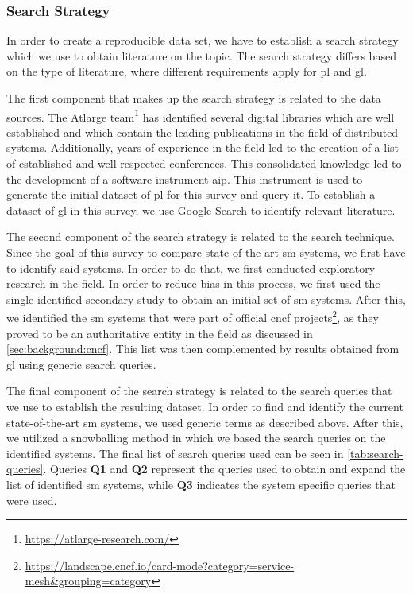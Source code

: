 \subsubsection{Search Strategy}
\label{sec:survey:methodology:review-protocol:search-strategy}

In order to create a reproducible data set, we have to establish a search strategy which we use to obtain literature on the topic. The search strategy differs based on the type of literature, where different requirements apply for \gls{pl} and \gls{gl}.


The first component that makes up the search strategy is related to the data sources. The Atlarge  team\footnote{\url{https://atlarge-research.com/}} has identified several digital libraries which are well established and which contain the leading publications in the field of distributed systems. Additionally, years of experience in the field led to the creation of a list of established and well-respected conferences. This consolidated knowledge led to the development of a software instrument \gls{aip}. This instrument is used to generate the initial dataset of \gls{pl} for this survey and query it. To establish a dataset of \gls{gl} in this survey, we use Google Search to identify relevant literature.

The second component of the search strategy is related to the search technique. Since the goal of this survey to compare state-of-the-art \gls{sm} systems, we first have to identify said systems. In order to do that, we first conducted exploratory research in the field. In order to reduce bias in this process, we first used the single identified secondary study \cite{service-mesh-survey} to obtain an initial set of \gls{sm} systems. After this, we identified the \gls{sm} systems that were part of official \gls{cncf} projects\footnote{\url{https://landscape.cncf.io/card-mode?category=service-mesh&grouping=category}}, as they proved to be an authoritative entity in the field as discussed in \cref{sec:background:cncf}. This list was then complemented by results obtained from \gls{gl} using generic search queries. 


The final component of the search strategy is related to the search queries that we use to establish the resulting dataset. In order to find and identify the current state-of-the-art \gls{sm} systems, we used generic terms as described above. After this, we utilized a snowballing method in which we based the search queries on the identified systems. The final list of search queries used can be seen in \cref{tab:search-queries}. Queries \textbf{Q1} and \textbf{Q2} represent the queries used to obtain and expand the list of identified \gls{sm} systems, while \textbf{Q3} indicates the system specific queries that were used. 

